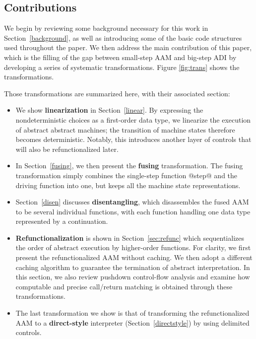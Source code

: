 \documentclass[acmsmall]{acmart}\settopmatter{}
\begin{document}
\subsection{Contributions}

We begin by reviewing some background
necessary for this work in Section~\ref{background}, as well as introducing some of the basic
code structures used throughout the paper. We then address the main contribution of this
paper, which is the filling of the gap between small-step AAM and big-step ADI by developing a
series of systematic transformations. Figure \ref{fig:trans} shows the transformations.

Those transformations are summarized here, with their associated section:

\begin{itemize}
\item We show \textbf{linearization} in Section~\ref{linear}. By expressing the
  nondeterministic choices as a first-order data type, we linearize the execution
  of abstract abstract machines; the transition of machine states therefore becomes deterministic. Notably, this introduces another layer of controls that will also be refunctionalized later.

\item In Section~\ref{fusing}, we then present the \textbf{fusing} transformation.
  The fusing transformation simply combines the single-step function @step@ and the driving
  function into one, but keeps all the machine state representations.

\item Section~\ref{disen} discusses \textbf{disentangling}, which disassembles the fused AAM to be several individual functions, with each function handling one data type represented by a continuation.

\item \textbf{Refunctionalization} is shown in Section~\ref{sec:refunc} which sequentializes
  the order of abstract execution by higher-order functions.
  For clarity, we first present the refunctionalized AAM without caching. We then adopt a different caching algorithm to guarantee the termination of abstract interpretation.
  In this section, we also review pushdown control-flow analysis and examine how computable
    and precise call/return matching is obtained through these transformations.

\item The last transformation we show is that of transforming the refunctionalized AAM
  to a \textbf{direct-style} interpreter (Section~\ref{directstyle}) by using delimited controls.

\end{itemize}
\end{document}
